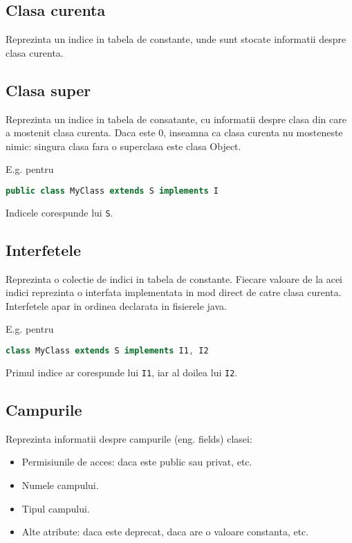 \subsection{Clasa curenta}

Reprezinta un indice in tabela de constante, unde sunt stocate
informatii despre clasa curenta.

\subsection{Clasa super}

Reprezinta un indice in tabela de consatante, cu informatii despre clasa
din care a mostenit clasa curenta. Daca este 0, inseamna ca clasa
curenta nu mosteneste nimic: singura clasa fara o superclasa este clasa
Object.

E.g. pentru

\begin{lstlisting}[language=Java]
public class MyClass extends S implements I
\end{lstlisting}

Indicele corespunde lui \texttt{S}.

\subsection{Interfetele}

Reprezinta o colectie de indici in tabela de constante. Fiecare valoare
de la acei indici reprezinta o interfata implementata in mod direct de
catre clasa curenta. Interfetele apar in ordinea declarata in fisierele
java.

E.g. pentru

\begin{lstlisting}[language=Java]
class MyClass extends S implements I1, I2
\end{lstlisting}

Primul indice ar corespunde lui \texttt{I1}, iar al doilea lui
\texttt{I2}.

\subsection{Campurile}\label{campurile}

Reprezinta informatii despre campurile (eng. fields) clasei:
\begin{itemize}
    \item Permisiunile de acces: daca este public sau privat, etc.
    \item Numele campului.
    \item Tipul campului.
    \item Alte atribute: daca este deprecat, daca are o valoare constanta, etc.
\end{itemize}

